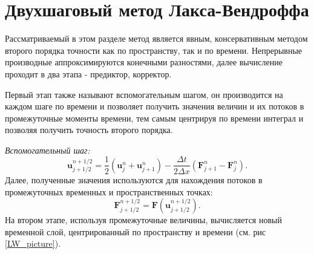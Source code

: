 \documentclass[a4paper]{article}
\begin{document}
	\section{Двухшаговый метод Лакса-Вендроффа}
	Рассматриваемый в этом разделе метод является явным, консервативным методом второго порядка точности как по пространству, так и по времени. Непрерывные производные аппроксимируются конечными разностями, далее вычисление проходит в два этапа - предиктор, корректор. 
	
	Первый этап также называют вспомогательным шагом, он производится на каждом шаге по времени и позволяет получить значения величин и их потоков в промежуточные моменты времени, тем самым центрируя по времени интеграл и позволяя получить точность второго порядка. 
	
	\textit{Вспомогательный шаг:}
	\begin{equation}
		\mathbf{u}_{j+1/2}^{n+1/2} = \frac{1}{2} \left(\mathbf{u}_{j}^{n} + \mathbf{u}_{j+1}^{n}\right)
						- \frac{\Delta t}{2 \Delta x}
						\left(\mathbf{F}_{j+1}^{n} - \mathbf{F}_{j}^{n}\right) .
	\end{equation}
	Далее, полученные значения используются для нахождения потоков в промежуточных временных и пространственных точках:
	\begin{equation}
		\mathbf{F}_{j+1/2}^{n+1/2} = \mathbf{F} \left( \mathbf{u}_{j+1/2}^{n+1/2} \right).
	\end{equation}
	На втором этапе, используя промежуточные величины, вычисляется новый временной слой, центрированный по пространству и времени (см. рис \ref{LW_picture}).
	
\end{document}
